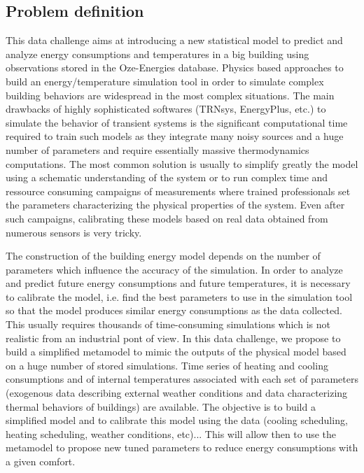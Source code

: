 \documentclass[nolayout]{article}
\begin{document}
\subsection*{Problem definition}
This data challenge aims at introducing a new statistical model to predict and analyze energy consumptions and temperatures in a big building using observations stored in the Oze-Energies database. Physics based approaches to build an energy/temperature simulation tool in order to simulate complex building behaviors are widespread in the most complex situations. The main drawbacks of highly sophisticated softwares (TRNsys, EnergyPlus, etc.) to simulate the behavior of transient systems is the significant computational time required to train such models as they integrate many noisy sources and a huge number of parameters and require essentially massive thermodynamics computations. The most common solution is usually to simplify greatly the model using a  schematic understanding of the system or to run complex  time  and  ressource  consuming  campaigns  of  measurements where trained professionals set the parameters characterizing the physical properties of the system. Even after such campaigns, calibrating these models based on real data obtained from numerous sensors is very tricky. 

The construction of the building energy model depends on the number of
parameters  which influence the accuracy of the simulation. In order to analyze and predict future energy consumptions and future temperatures, it is necessary to calibrate the model, i.e. find the best parameters to use in the simulation tool so that the model produces similar energy consumptions as the data collected. This usually requires thousands of time-consuming simulations which is not realistic from an industrial pont of view. In this data challenge, we propose to build a simplified metamodel to mimic the outputs of the physical model based on a huge number of stored simulations. Time series of heating and cooling  consumptions and of internal temperatures associated with each set of parameters (exogenous data describing external weather conditions and data characterizing thermal behaviors of buildings) are available. The objective is to build a simplified model and to calibrate this model using the data  (cooling scheduling, heating scheduling, weather conditions, etc)...  This will allow then to use the metamodel to propose new tuned parameters to reduce energy consumptions with a given comfort.
\end{document}
